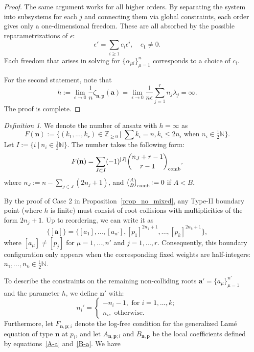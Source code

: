 \documentclass[11pt]{amsart}
\theoremstyle{remark}
\newtheorem{definition}[theorem]{Definition}
\numberwithin{equation}{section}
\begin{document}
\begin{proof}
The same argument works for all higher orders. By separating the system into subsystems for each $j$ and connecting them via global constraints, each order gives only a one-dimensional freedom. These are all absorbed by the possible reparametrizations of $\epsilon$:
\[
    \epsilon' = \sum_{i\geq 1}c_i \epsilon^i, \quad c_1 \neq 0.
\]
Each freedom that arises in solving for $\{ \alpha_{\mu i} \}_{\mu=1}^n$ corresponds to a choice of $c_i$. 

For the second statement, note that 
\[
    h := \lim_{\epsilon\rightarrow 0} \frac{1}{n} \zeta_{\mathbf{n},\mathbf{p}}(\mathbf{a}) = \lim_{\epsilon\rightarrow 0} \frac{1}{n \epsilon} \sum_{j=1}^r n_j \lambda_j =  \infty.
\]
The proof is complete.
\end{proof}

\begin{definition}
We denote the number of ansatz with $h=\infty$ as
\[
    F(\mathbf{n}) := \{ (k_1,\dots,k_r) \in \mathbb{Z}_{\geq 0}\ | \ \sum k_i=n, k_i \leq 2n_i \text{ when } n_i \in \tfrac{1}{2} \mathbb{N}   \}.
\]
Let $I :=\{ i \ |\ n_i \in \tfrac{1}{2} \mathbb{N}  \}$. The number takes the following form:
\[
    F(\mathbf{n}) = \sum_{ J \subset I } (-1)^{|J|} \binom{n_J+r-1}{r-1}_{\rm comb}, 
\]
where $n_J:= n - \sum_{j \in J}(2n_j+1)$, and $\binom{A}{B}_{\rm comb}:= 0$ if $A < B$. 
\end{definition}

By the proof of Case 2 in Proposition~\ref{prop_no_mixed}, any Type-II boundary point (where $h$ is finite) must consist of root collisions with multiplicities of the form $2n_j+1$. Up to reordering, we can write it as
\[
    \{[\mathbf{a}]\} = \{[a_1], \dots, [a_{n'}], [p_1]^{2n_1+1}, \dots, [p_k]^{2n_k+1}\},
\]
where $[a_\mu] \neq [p_j]$ for $\mu=1,\dots,n'$ and $j=1,\dots,r$. Consequently, this boundary configuration only appears when the corresponding fixed weights are half-integers: $n_1,\dots,n_k \in \frac{1}{2}\mathbb{N}$.

To describe the constraints on the remaining non-colliding roots $\mathbf{a}' = \{a_\mu\}_{\mu=1}^{n'}$ and the parameter $h$, we define $\mathbf{n}'$ with:
\[
n_i'=
\begin{cases}
    -n_i-1, \text{ for }i=1,\dots,k;
    \\
    n_i, \text{ otherwise}.
\end{cases}
\]
Furthermore, let $F_{\mathbf{n},\mathbf{p};i}$ denote the log-free condition for the generalized Lam\'e equation of type $\mathbf{n}$ at $p_i$, and let $A_{\mathbf{n},\mathbf{p};i}$ and $B_{\mathbf{n},\mathbf{p}}$ be the local coefficients defined by equations~\eqref{A-a} and~\eqref{B-a}. We have
\end{document}
